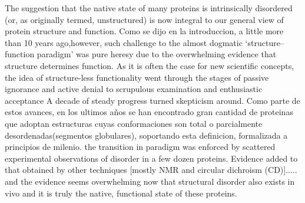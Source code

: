 The suggestion that the native state of many proteins is intrinsically disordered (or, as originally termed, unstructured) is now integral to our general view of protein structure and function.
Como se dijo en la introduccion, a little more than 10 years ago,however, such challenge to the almost dogmatic ‘structure–function paradigm’ was pure heresy due to the overwhelming evidence that structure determines function.
As it is often the case for new scientific concepts, the idea of structure-less functionality went through the stages of passive ignorance and active denial to scrupulous examination and enthusiastic acceptance
A decade of steady progress turned skepticism around.
Como parte de estos avances, en los ultimos años se han encontrado gran cantidad de proteinas que adoptan estructuras cuyas conformaciones son total o parcialmente desordenadas(segmentos globulares), soportando esta definicion, formalizada a principios de milenio. 
the transition in paradigm was enforced by scattered experimental observations of disorder in a few dozen proteins. 
Evidence added to that obtained by other techniques [mostly NMR and circular dichroism (CD)]..... and the evidence seems overwhelming now that structural disorder also exists in vivo and it is truly the native, functional state of these proteins.



